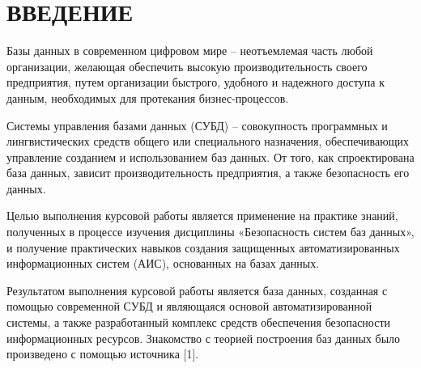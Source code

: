 \chapter*{ВВЕДЕНИЕ}

Базы данных в современном цифровом мире – неотъемлемая часть любой организации, желающая обеспечить высокую производительность своего предприятия, путем организации быстрого, удобного и надежного доступа к данным, необходимых для протекания бизнес-процессов. 

Системы управления базами данных (СУБД) – совокупность программных и лингвистических средств общего или специального назначения, обеспечивающих управление созданием и использованием баз данных. От того, как спроектирована база данных, зависит производительность предприятия, а также безопасность его данных.

Целью выполнения курсовой работы является применение на практике знаний, полученных в процессе изучения дисциплины «Безопасность систем баз данных», и получение практических навыков создания защищенных автоматизированных информационных систем (АИС), основанных на базах данных.

Результатом выполнения курсовой работы является база данных, созданная с помощью современной СУБД и являющаяся основой автоматизированной системы, а также разработанный комплекс средств обеспечения безопасности информационных ресурсов.
Знакомство с теорией построения баз данных было произведено с помощью источника [1].

